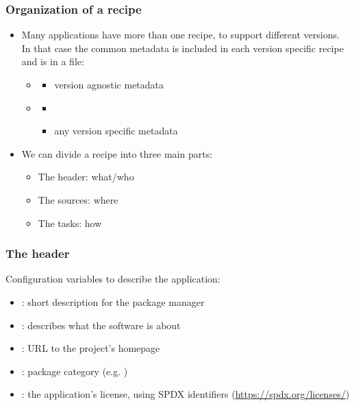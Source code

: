 \begin{frame}
  \frametitle{Organization of a recipe}
  \begin{itemize}
    \item Many applications have more than one recipe, to support
      different versions. In that case the common metadata is
      included in each version specific recipe and is in a 
      file:
      \begin{itemize}
        \item {}
          \begin{itemize}
            \item version agnostic metadata
          \end{itemize}
        \item {}
          \begin{itemize}
            \item {}
            \item any version specific metadata
          \end{itemize}
      \end{itemize}
    \item We can divide a recipe into three main parts:
      \begin{itemize}
        \item The header: what/who
        \item The sources: where
        \item The tasks: how
      \end{itemize}
  \end{itemize}
\end{frame}

\begin{frame}
  \frametitle{The header}
  Configuration variables to describe the application:
  \begin{itemize}
    \item {}: short description for the package manager
    \item {}: describes what the software is about
    \item {}: URL to the project's homepage
    \item {}: package category (e.g. )
    \item {}: the application's license, using SPDX identifiers
      (\url{https://spdx.org/licenses/})
  \end{itemize}
\end{frame}

